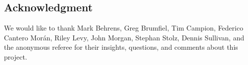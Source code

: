 
\subsection*{Acknowledgment}

We would like to thank Mark Behrens, Greg Brumfiel, Tim Campion, Federico Cantero Mor\'an, Riley Levy, John Morgan, Stephan Stolz, Dennis Sullivan, and the anonymous referee for their insights, questions, and comments about this project.